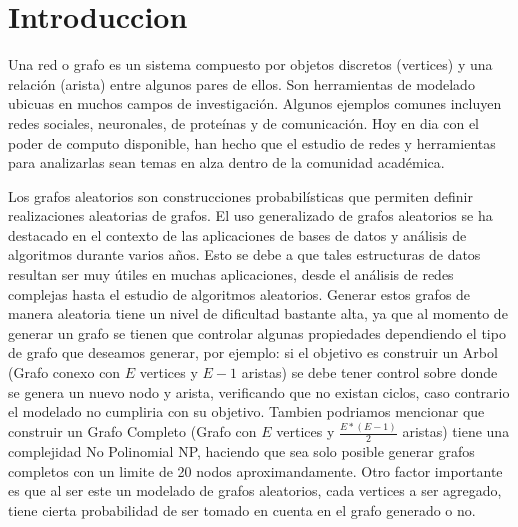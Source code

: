 \documentclass[11pt]{extarticle}
\begin{document}
\newcommand\justificacion{Justificaci\'on }
\newcommand\guion{\item[-]}

\renewcommand{\labelenumii}{\arabic{enumi}.\arabic{enumii}}
\renewcommand{\labelenumiii}{\arabic{enumi}.\arabic{enumii}.\arabic{enumiii}}
\renewcommand{\labelenumiv}{\arabic{enumi}.\arabic{enumii}.\arabic{enumiii}.\arabic{enumiv}}

\section{Introduccion} 
Una red o grafo es un sistema compuesto por objetos discretos (vertices) y una relación (arista) entre algunos pares
de ellos. Son herramientas de modelado ubicuas en muchos campos de investigación. 
Algunos ejemplos comunes incluyen redes sociales, neuronales, de proteínas y de comunicación.
Hoy en dia con el poder de computo disponible, han hecho que el estudio de redes y
herramientas para analizarlas sean temas en alza dentro de la comunidad académica.\hfill \break

Los grafos aleatorios son construcciones probabilísticas que permiten definir realizaciones
aleatorias de grafos. 
El uso generalizado de grafos aleatorios se ha destacado en el contexto de las  
aplicaciones de bases de datos y análisis de algoritmos durante 
varios años. Esto se debe a que tales estructuras de datos resultan ser muy útiles 
en muchas  aplicaciones, desde el análisis de redes complejas hasta el estudio de 
algoritmos aleatorios. Generar estos grafos de manera aleatoria tiene un nivel de dificultad
bastante alta, ya que al momento de generar un grafo se tienen que controlar algunas propiedades 
dependiendo el tipo de grafo que deseamos generar, por ejemplo: si el objetivo es construir un Arbol 
(Grafo conexo con \(E\) vertices y \(E - 1\) aristas)
se debe tener control sobre donde se genera un nuevo nodo y arista, verificando que no existan
ciclos, caso contrario el modelado no cumpliria con su objetivo. Tambien podriamos mencionar que construir
un Grafo Completo (Grafo con \(E\) vertices y \( \frac{E * (E - 1)}{2}\) aristas) tiene una complejidad No Polinomial NP, 
haciendo que sea solo posible generar grafos completos con un limite de 20 nodos aproximandamente.
Otro factor importante es que al ser este un modelado de grafos aleatorios, cada vertices a ser agregado,
tiene cierta probabilidad de ser tomado en cuenta en el grafo generado o no. \hfill\break\break 
\end{document}
